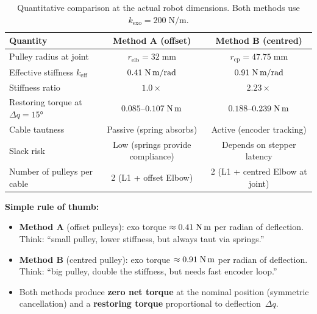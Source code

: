 \documentclass[11pt, a4paper]{article}
\begin{document}
\begin{table}[h]
\centering
\begin{tabular}{@{}lcc@{}}
\toprule
\textbf{Quantity}
    & \textbf{Method A (offset)}
    & \textbf{Method B (centred)} \\
\midrule
Pulley radius at joint
    & $r_{\text{elb}} = 32\;\text{mm}$
    & $r_{\text{cp}} = 47.75\;\text{mm}$ \\[3pt]
Effective stiffness $k_{\text{eff}}$
    & $0.41\;\text{N\,m/rad}$
    & $0.91\;\text{N\,m/rad}$ \\[3pt]
Stiffness ratio
    & $1.0\times$
    & $2.23\times$ \\[3pt]
Restoring torque at $\Delta q = 15°$
    & $0.085$--$0.107\;\text{N\,m}$
    & $0.188$--$0.239\;\text{N\,m}$ \\[3pt]
Cable tautness
    & Passive (spring absorbs)
    & Active (encoder tracking) \\[3pt]
Slack risk
    & Low (springs provide compliance)
    & Depends on stepper latency \\[3pt]
Number of pulleys per cable
    & 2 (L1 + offset Elbow)
    & 2 (L1 + centred Elbow at joint) \\
\bottomrule
\end{tabular}
\caption{Quantitative comparison at the actual robot dimensions.
Both methods use $k_{\text{exo}} = 200\;\text{N/m}$.}
\label{tab:force-comparison}
\end{table}

\begin{mdframed}
\textbf{Simple rule of thumb:}
\begin{itemize}
    \item \textbf{Method A} (offset pulleys): exo torque
        $\approx 0.41\;\text{N\,m}$ per radian of deflection.
        Think: ``small pulley, lower stiffness, but always taut via springs.''
    \item \textbf{Method B} (centred pulley): exo torque
        $\approx 0.91\;\text{N\,m}$ per radian of deflection.
        Think: ``big pulley, double the stiffness, but needs fast encoder loop.''
    \item Both methods produce \textbf{zero net torque} at the nominal
        position (symmetric cancellation) and a \textbf{restoring torque}
        proportional to deflection~$\Delta q$.
\end{itemize}
\end{mdframed}

\end{document}
